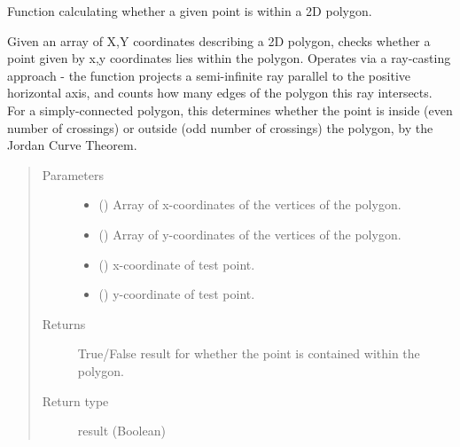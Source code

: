 \documentclass[letterpaper,10pt,english]{sphinxmanual}
\begin{document}

\begin{fulllineitems}
\label{\detokenize{eqtools:eqtools.core.inPolygon}}
Function calculating whether a given point is within a 2D polygon.

Given an array of X,Y coordinates describing a 2D polygon, checks whether a
point given by x,y coordinates lies within the polygon. Operates via a
ray-casting approach - the function projects a semi-infinite ray parallel to
the positive horizontal axis, and counts how many edges of the polygon this
ray intersects. For a simply-connected polygon, this determines whether the
point is inside (even number of crossings) or outside (odd number of
crossings) the polygon, by the Jordan Curve Theorem.
\begin{quote}\begin{description}
\item[{Parameters}] \leavevmode\begin{itemize}
\item {} 
 () \textendash{} Array of x-coordinates of the vertices of the polygon.

\item {} 
 () \textendash{} Array of y-coordinates of the vertices of the polygon.

\item {} 
 () \textendash{} x-coordinate of test point.

\item {} 
 () \textendash{} y-coordinate of test point.

\end{itemize}

\item[{Returns}] \leavevmode
True/False result for whether the point is contained within the polygon.

\item[{Return type}] \leavevmode
result (Boolean)

\end{description}\end{quote}

\end{fulllineitems}
\end{document}
